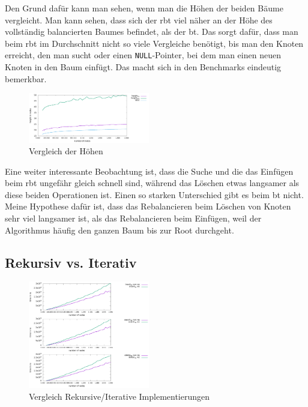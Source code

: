 \documentclass[11pt]{article}
\newcommand{\lstin}[1]{\lstinline[language=C]{#1}}
\begin{document}
Den Grund dafür kann man sehen, wenn man die Höhen der beiden Bäume vergleicht. Man kann sehen, dass sich der \gls{rbt} viel näher an der Höhe des vollständig balancierten Baumes befindet, 
als der \gls{bt}. Das sorgt dafür, dass man beim \gls{rbt} im Durchschnitt nicht so viele Vergleiche benötigt, bis man den Knoten erreicht, den man sucht oder einen \lstin{NULL}-Pointer, bei dem 
man einen neuen Knoten in den Baum einfügt. Das macht sich in den Benchmarks eindeutig bemerkbar.  

\begin{figure}[h]
  \centering
  \includegraphics[width=200px]{../benchmark/compare_height.png}
  \caption{Vergleich der Höhen}
\end{figure}

Eine weiter interessante Beobachtung ist, dass die Suche und die das Einfügen beim \gls{rbt} ungefähr gleich schnell sind, während das Löschen etwas langsamer als diese beiden Operationen ist.
Einen so starken Unterschied gibt es beim \gls{bt} nicht. Meine Hypothese dafür ist, dass das Rebalancieren beim Löschen von Knoten sehr viel langsamer ist, als das Rebalancieren beim Einfügen, weil
der Algorithmus häufig den ganzen Baum bis zur Root durchgeht. 

\subsection{Rekursiv vs. Iterativ} \label{ben2}

\begin{figure}
  \centering
  \includegraphics[width=200px]{../benchmark/compare_insert.png}
  \caption{Vergleich Rekursive/Iterative Implementierungen}
  \label{bir}
\end{figure}
\end{document}
